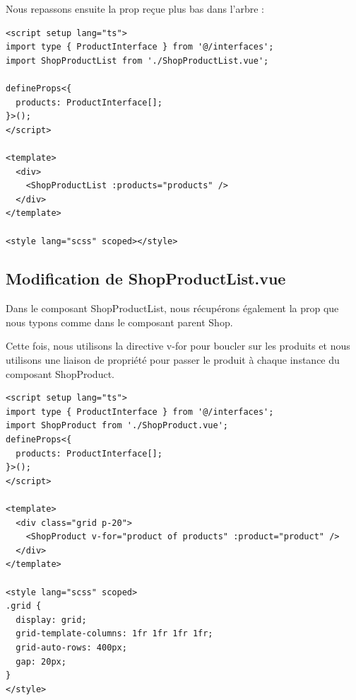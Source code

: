 \documentclass{article}
\begin{document}
Nous repassons ensuite la {\color{monOrange}prop} reçue plus bas dans l'arbre :
\begin{verbatim}
<script setup lang="ts">
import type { ProductInterface } from '@/interfaces';
import ShopProductList from './ShopProductList.vue';

defineProps<{
  products: ProductInterface[];
}>();
</script>

<template>
  <div>
    <ShopProductList :products="products" />
  </div>
</template>

<style lang="scss" scoped></style>
\end{verbatim}
\subsection{Modification de {\color{monOrange}ShopProductList.vue}}
Dans le composant {\color{monOrange}ShopProductList}, nous récupérons également la {\color{monOrange}prop} que nous typons comme dans le composant parent {\color{monOrange}Shop}.

Cette fois, nous utilisons la directive {\color{monOrange}v-for} pour boucler sur les produits et nous utilisons une liaison de propriété pour passer le produit à chaque instance du composant {\color{monOrange}ShopProduct}.
\begin{verbatim}
<script setup lang="ts">
import type { ProductInterface } from '@/interfaces';
import ShopProduct from './ShopProduct.vue';
defineProps<{
  products: ProductInterface[];
}>();
</script>

<template>
  <div class="grid p-20">
    <ShopProduct v-for="product of products" :product="product" />
  </div>
</template>

<style lang="scss" scoped>
.grid {
  display: grid;
  grid-template-columns: 1fr 1fr 1fr 1fr;
  grid-auto-rows: 400px;
  gap: 20px;
}
</style>
\end{verbatim}
\end{document}
